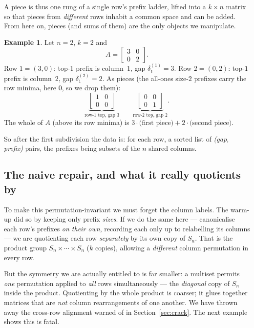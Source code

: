\documentclass[11pt,a4paper]{article}
\theoremstyle{definition}
\newtheorem{example}[definition]{Example}
\theoremstyle{plain}
\newcommand{\Sn}{S_n}
\begin{document}
\noindent
A piece is thus one rung of a single row's prefix ladder, lifted into a
$k\times n$ matrix so that pieces from \emph{different} rows inhabit a common
space and can be added. From here on, pieces (and sums of them) are the only
objects we manipulate.

\begin{example}\label{ex:firstsd}
Let $n=2$, $k=2$ and
\[
   A=\begin{bmatrix}3&0\\[1pt]0&2\end{bmatrix}.
\]
Row $1=(3,0)$: top-$1$ prefix is column~$1$, gap $\delta^{(1)}_1=3$. Row
$2=(0,2)$: top-$1$ prefix is column~$2$, gap $\delta^{(2)}_1=2$. As pieces (the
all-ones size-$2$ prefixes carry the row minima, here $0$, so we drop them):
\[
  \underbrace{\begin{bmatrix}1&0\\0&0\end{bmatrix}}_{\text{row-1 top, gap }3}
  \qquad
  \underbrace{\begin{bmatrix}0&0\\0&1\end{bmatrix}}_{\text{row-2 top, gap }2}.
\]
The whole of $A$ (above its row minima) is $3\cdot\text{(first piece)}+2\cdot
\text{(second piece)}$.
\end{example}

So after the first subdivision the data is: for each row, a sorted list of
\emph{(gap, prefix)} pairs, the prefixes being subsets of the $n$ shared
columns.

\subsection{The naive repair, and what it really quotients by}

To make this permutation-invariant we must forget the column labels. The
warm-up did so by keeping only prefix \emph{sizes}. If we do the same here ---
canonicalise each row's prefixes \emph{on their own}, recording each only up to
relabelling its columns --- we are quotienting each row \emph{separately} by its
own copy of $\Sn$. That is the product group $\Sn\times\cdots\times\Sn$ ($k$
copies), allowing a \emph{different} column permutation in every row.

But the symmetry we are actually entitled to is far smaller: a multiset permits
\emph{one} permutation applied to \emph{all} rows simultaneously --- the
\emph{diagonal} copy of $\Sn$ inside the product. Quotienting by the whole
product is coarser; it glues together matrices that are \emph{not} column
rearrangements of one another. We have thrown away the cross-row alignment
warned of in Section~\ref{sec:crack}. The next example shows this is fatal.
\end{document}
